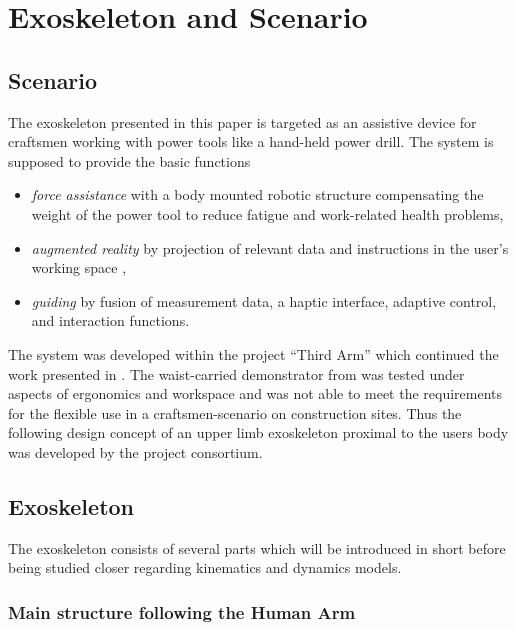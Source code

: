 \documentclass[twocolumn,10pt]{IFTOMM}
\begin{document}
\section{Exoskeleton and Scenario}
\label{sec:exo_scenario}
\subsection{Scenario}

The exoskeleton presented in this paper is targeted as an assistive device for craftsmen working with power tools like a hand-held power drill.
The system is supposed to provide the basic functions
%
\begin{itemize}
    \item \emph{force assistance} with a body mounted robotic structure compensating the weight of the power tool to reduce fatigue and work-related health problems,
    \item \emph{augmented reality} by projection of relevant data and instructions in the user's working space \cite{NuelleBriTapDem2018},
    \item \emph{guiding} by fusion of measurement data, a haptic interface, adaptive control, and interaction functions.
\end{itemize}
%
%
%
The system was developed within the project ``Third Arm'' \cite{NuelleSchTapLil2017} which continued the work presented in \cite{PetereitAlbJerSch2012}. 
The waist-carried demonstrator from \cite{PetereitAlbJerSch2012} was tested under aspects of ergonomics and workspace and was not able to meet the requirements for the flexible use in a  craftsmen-scenario on construction sites. Thus the following design concept of an upper limb exoskeleton proximal to the users body was developed by the project consortium.

\subsection{Exoskeleton}

The exoskeleton consists of several parts which will be introduced in short before being studied closer regarding kinematics and dynamics models.

\subsubsection{Main structure following the Human Arm}
\end{document}
